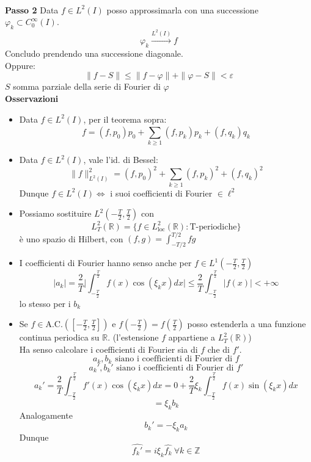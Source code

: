 \documentclass[a4paper]{article}
\newcommand{\R}{\mathbb{R}}
\newcommand{\Z}{\mathbb{Z}}
\begin{document}
\\\textbf{Passo 2} Data $f\in L^{2}(I)$ posso approssimarla con una successione $\varphi_k \subset C_0^\infty(I)$.
\[\varphi_k\xrightarrow{L^{2}(I)}f\]
Concludo prendendo una successione diagonale.
\\Oppure:
\[\|f-S\|\le \|f-\varphi\|+\|\varphi-S\|<\varepsilon\]
$S$ somma parziale della serie di Fourier di $\varphi$ 
\\\textbf{Osservazioni}
\begin{itemize}
	\item Data $f\in L^{2}(I)$, per il teorema sopra:
		\[f=(f,p_0)p_0+\sum_{k\ge 1}^{} (f,p_k)p_k+(f,q_k)q_k\]
	\item Data $f\in L^{2}(I)$, vale l'id. di Bessel:
		\[\|f\|_{L^{2}(I)}^2=(f,p_0)^2+\sum_{k\ge 1}^{} (f,p_k)^2+(f,q_k)^2\]
		Dunque $f\in L^{2}(I) \iff $ i suoi coefficienti di Fourier $\in \ell^2$ 
	\item Possiamo sostituire $L^{2}(-\frac{T}{2},\frac{T}{2})$ con 
		\[ L^{2}_T(\R)=\{f\in L_{\text{loc}}^2(\R):\text{T-periodiche}\} \]
		è uno spazio di Hilbert, con $(f,g)=\int_{-T / 2}^{T / 2} fg $ 
	\item I coefficienti di Fourier hanno senso anche per $f\in L^{1}(-\frac{T}{2},\frac{T}{2})$ 
		\[|a_k|=\frac{2}{T}\bigg|\int_{-\frac{T}{2}}^{\frac{T}{2}}f(x)\cos(\xi_kx)dx\bigg|\le \frac{2}{T } \int_{-\frac{T}{2}}^{\frac{T}{2}} |f(x)|<+\infty\]
		lo stesso per i $b_k$ 
	\item Se $f\in \text{A.C.}([-\frac{T}{2},\frac{T}{2}])$ e $f(-\frac{T}{2})=f(\frac{T}{2})$ posso estenderla a una funzione continua periodica su $\R$. (l'estensione $f$ appartiene a $L_T^2(\R)$)
		\\Ha senso calcolare i coefficienti di Fourier sia di $f$ che di $f'$.
		\[a_k,b_k\text{ siano i coefficienti di Fourier di }f\]
		\[a_k',b_k'\text{ siano i coefficienti di Fourier di }f'\]
\[a_k'=\frac{2}{T} \int_{-\frac{T}{2}}^{\frac{T}{2}} f'(x)\cos(\xi_kx)dx=0+\frac{2}{T}\xi_k \int_{-\frac{T}{2}}^{\frac{T}{2}} f(x)\sin(\xi_kx)dx\]
\[=\xi_kb_k\]
Analogamente
\[b_k'=-\xi_ka_k\]
Dunque
\[\hat{f_k'}=i\xi_k \hat{f_k}\ \forall k\in \Z\]

\end{itemize}
\end{document}

